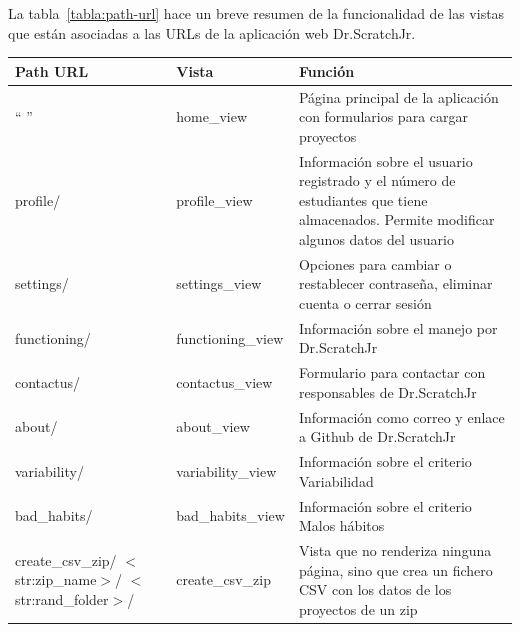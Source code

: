 \documentclass[a4paper, 12pt]{book}
\begin{document}
    \begin{table}[H]
     La tabla~\ref{tabla:path-url} hace un breve resumen de la funcionalidad de las vistas que están asociadas a las URLs de la aplicación web Dr.ScratchJr.
     \begin{center}
     \begin{tabular}{ | m{3.1cm} | m{3.3cm} | m{8.8cm} | }
      \hline \textbf{Path URL} & \textbf{Vista} & \textbf{Función}\\ \hline
    
        `` '' &
        home\_view &
        Página principal de la aplicación con formularios para cargar proyectos \\ \hline
        
        profile/ &
        profile\_view &
        Información sobre el usuario registrado y el número de estudiantes que tiene almacenados. Permite modificar algunos datos del usuario \\ \hline 
        
        settings/ &
        settings\_view &
        Opciones para cambiar o restablecer contraseña, eliminar cuenta o cerrar sesión \\ \hline
        
        functioning/ &
        functioning\_view &
        Información sobre el manejo por Dr.ScratchJr \\ \hline
        
        contactus/ &
        contactus\_view &
        Formulario para contactar con responsables de Dr.ScratchJr \\ \hline
        
        about/ &
        about\_view &
        Información como correo y enlace a Github de Dr.ScratchJr \\ \hline
        
        variability/ &
        variability\_view &
        Información sobre el criterio Variabilidad \\ \hline
        
        bad\_habits/ &
        bad\_habits\_view &
        Información sobre el criterio Malos hábitos \\ \hline
        
        create\_csv\_zip/ \newline $<$str:zip\_name$>$/ \newline $<$str:rand\_folder$>$/ &
        create\_csv\_zip &
        Vista que no renderiza ninguna página, sino que crea un fichero CSV con los datos de los proyectos de un zip \\ \hline
        

\end{tabular}
\end{center}
\end{table}
\end{document}
